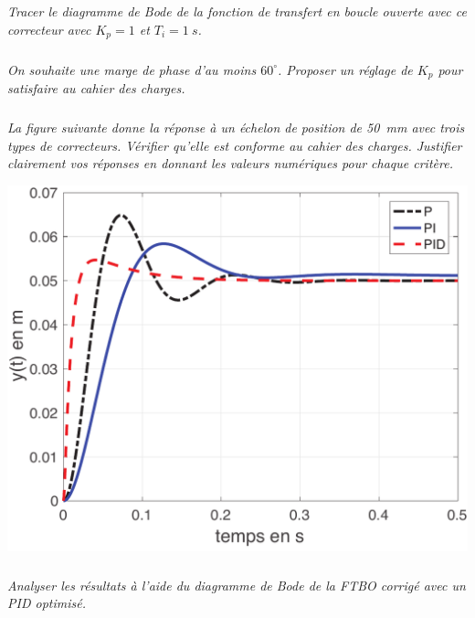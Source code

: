 \documentclass[10pt,fleqn]{article} %
\begin{document}
\begin{multicols}{2}
\subparagraph{}\textit{Tracer le diagramme de Bode de la fonction de transfert en boucle ouverte avec ce correcteur avec $K_p=1$ et $T_i = \SI{1}{s}$.}%

\subparagraph{}\textit{On souhaite une marge de phase d'au moins $60^{\circ}$. Proposer un réglage de $K_p$ pour satisfaire au cahier des charges.}%

\subparagraph{}\textit{La figure suivante %
donne la réponse à un échelon de position de \SI{50}{mm} avec trois types de correcteurs. Vérifier qu'elle est conforme au cahier des charges. Justifier clairement vos réponses en donnant les valeurs numériques pour chaque critère.}


\begin{center}
\includegraphics[width=1.0\linewidth]{images/matlab/rep_temp.pdf}
\end{center}


\subparagraph{}\textit{Analyser les résultats à l'aide du diagramme de Bode de la FTBO corrigé avec un PID optimisé.}%


\end{multicols}
\end{document}
